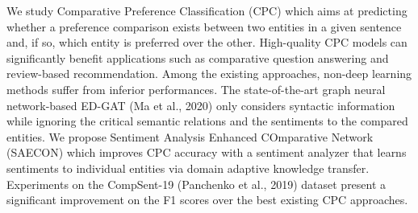We study Comparative Preference Classification (CPC) which aims at predicting whether a preference comparison exists between two entities in a given sentence and, if so, which entity is preferred over the other. High-quality CPC models can significantly benefit applications such as comparative question answering and review-based recommendation. Among the existing approaches, non-deep learning methods suffer from inferior performances. The state-of-the-art graph neural network-based ED-GAT (Ma et al., 2020) only considers syntactic information while ignoring the critical semantic relations and the sentiments to the compared entities. We propose Sentiment Analysis Enhanced COmparative Network (SAECON) which improves CPC accuracy with a sentiment analyzer that learns sentiments to individual entities via domain adaptive knowledge transfer. Experiments on the CompSent-19 (Panchenko et al.,  2019) dataset present a significant improvement on the F1 scores over the best existing CPC approaches.
